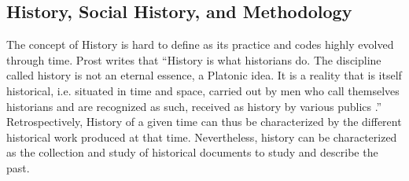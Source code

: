 

\subsection{History, Social History, and Methodology}\label{subsec:history-and-social-history}

The concept of History is hard to define as its practice and codes highly evolved through time.
Prost writes that ``History is what historians do. The discipline called history is not an eternal essence, a Platonic idea. It is a reality that is itself historical, i.e. situated in time and space, carried out by men who call themselves historians and are recognized as such, received as history by various publics \cite{prost2014}.''
Retrospectively, History of a given time can thus be characterized by the different historical work produced at that time.
Nevertheless, history can be characterized as the collection and study of historical documents to study and describe the past.

